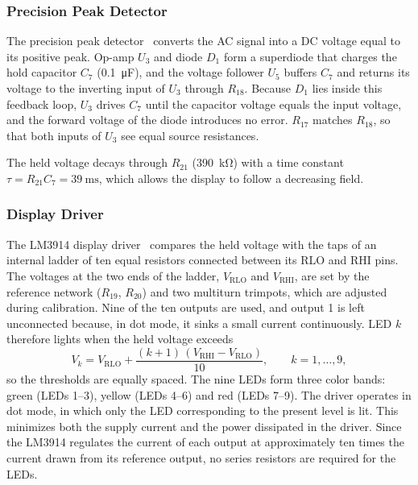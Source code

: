 \documentclass[11pt,a4paper]{article}
\begin{document}
\subsubsection{Precision Peak Detector}
The precision peak detector~\cite{horowitz2015,ti_an31} converts the AC signal into a DC voltage equal to its positive peak. Op-amp $U_3$ and diode $D_1$ form a superdiode that charges the hold capacitor $C_7$ (\SI{0.1}{\micro\farad}), and the voltage follower $U_5$ buffers $C_7$ and returns its voltage to the inverting input of $U_3$ through $R_{18}$. Because $D_1$ lies inside this feedback loop, $U_3$ drives $C_7$ until the capacitor voltage equals the input voltage, and the forward voltage of the diode introduces no error. $R_{17}$ matches $R_{18}$, so that both inputs of $U_3$ see equal source resistances.

The held voltage decays through $R_{21}$ (\SI{390}{\kilo\ohm}) with a time constant $\tau = R_{21}C_7 = \SI{39}{\milli\second}$, which allows the display to follow a decreasing field.

\subsubsection{Display Driver}
The LM3914 display driver~\cite{ti_lm3914} compares the held voltage with the taps of an internal ladder of ten equal resistors connected between its RLO and RHI pins. The voltages at the two ends of the ladder, $V_{\mathrm{RLO}}$ and $V_{\mathrm{RHI}}$, are set by the reference network ($R_{19}$, $R_{20}$) and two multiturn trimpots, which are adjusted during calibration. Nine of the ten outputs are used, and output 1 is left unconnected because, in dot mode, it sinks a small current continuously. LED $k$ therefore lights when the held voltage exceeds
\begin{equation}
  V_k = V_{\mathrm{RLO}} + \frac{(k+1)\,(V_{\mathrm{RHI}} - V_{\mathrm{RLO}})}{10},
  \qquad k = 1, \dots, 9,
  \label{eq:vk}
\end{equation}
so the thresholds are equally spaced. The nine LEDs form three color bands: green (LEDs 1--3), yellow (LEDs 4--6) and red (LEDs 7--9). The driver operates in dot mode, in which only the LED corresponding to the present level is lit. This minimizes both the supply current and the power dissipated in the driver. Since the LM3914 regulates the current of each output at approximately ten times the current drawn from its reference output, no series resistors are required for the LEDs.
\end{document}
